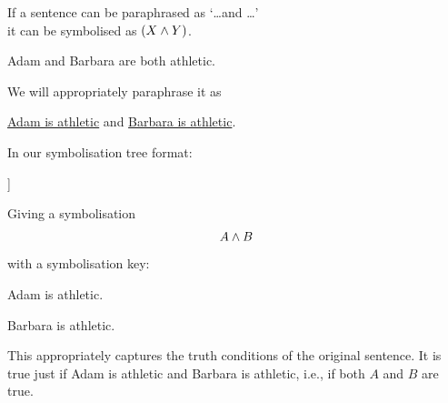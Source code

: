	\begin{highlighted}
		If a sentence can be paraphrased as `\ldots and \ldots' \\it can be symbolised as $(X\mathbin{\wedge}Y)$.
	\end{highlighted}



\begin{samplesent}
	\item Adam and Barbara are both athletic. 
\end{samplesent}

We will appropriately paraphrase it as 
\begin{samplesent}
	\item \underline{Adam is athletic} and \underline{Barbara is athletic}.
\end{samplesent}
In our symbolisation tree format:
\begin{center}
	\begin{forest}
		[Adam and Barbara are both athletic\\\ldots and \ldots\\$\ldots\eand\ldots$
		[Adam is athletic\\$A$]
		[Barbara is athletic\\$B$]
		]
	\end{forest}
\end{center}
Giving a symbolisation $$A\mathbin{\wedge} B$$ 
with a symbolisation key:
\begin{ekey}
	\item[A] Adam is athletic.
	\item[B] Barbara is athletic.
\end{ekey}

This appropriately captures the truth conditions of the original sentence. It is true just if Adam is athletic and Barbara is athletic, i.e., if both $A$ and $B$ are true. 

